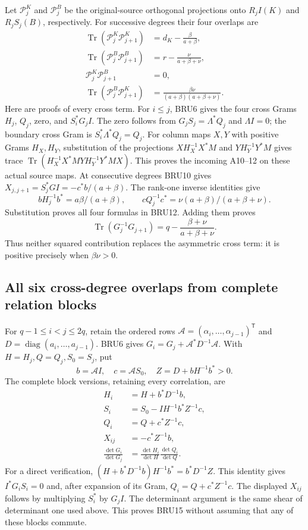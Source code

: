 \documentclass[11pt,a4paper]{article}
\begin{document}
Let $\mathcal P_j^K$ and $\mathcal P_j^B$ be the original-source
orthogonal projections onto $R_jI(K)$ and $R_jS_j(B)$, respectively.
For successive degrees their four overlaps are
\[
 \boxed{\begin{aligned}
 \operatorname{Tr}(\mathcal P_j^K\mathcal P_{j+1}^K)
    &=d_K-\frac{\beta}{a+\beta},\\
 \operatorname{Tr}(\mathcal P_j^B\mathcal P_{j+1}^B)
    &=r-\frac{\nu}{a+\beta+\nu},\\
 \mathcal P_j^K\mathcal P_{j+1}^B&=0,\\
 \operatorname{Tr}(\mathcal P_j^B\mathcal P_{j+1}^K)
    &=\frac{\beta\nu}{(a+\beta)(a+\beta+\nu)}.
 \end{aligned}}\tag{BRU12}
\]
Here are proofs of every cross term. For $i\leq j$, BRU6 gives
the four cross Grams $H_j$, $Q_j$, zero, and $S_i^*G_jI$.
The zero follows from $G_jS_j=\Lambda^*Q_j$ and $\Lambda I=0$;
the boundary cross Gram is $S_i^*\Lambda^*Q_j=Q_j$.
For column maps $X,Y$ with positive Grams $H_X,H_Y$, substitution
of the projections $XH_X^{-1}X^*M$ and $YH_Y^{-1}Y^*M$ gives
trace $\operatorname{Tr}(H_X^{-1}X^*MYH_Y^{-1}Y^*MX)$.
This proves the incoming A10--12 on these actual source maps.
At consecutive degrees BRU10 gives
$X_{j,j+1}=S_j^*GI=-c^*b/(a+\beta)$.
The rank-one inverse identities give
\[
 bH_j^{-1}b^*=a\beta/(a+\beta),\qquad
 cQ_j^{-1}c^*=\nu(a+\beta)/(a+\beta+\nu).
\]
Substitution proves all four formulas in BRU12. Adding them proves
\[
 \operatorname{Tr}(G_j^{-1}G_{j+1})
       =q-\frac{\beta+\nu}{a+\beta+\nu}.
 \tag{BRU13}
\]
Thus neither squared contribution replaces the asymmetric cross
term: it is positive precisely when $\beta\nu>0$.

\subsection{All six cross-degree overlaps from complete relation blocks}

For $q-1\leq i<j\leq2q$, retain the ordered rows
$\mathcal A=(\alpha_i,\ldots,\alpha_{j-1})^{\mathsf T}$ and
$D=\operatorname{diag}(a_i,\ldots,a_{j-1})$. BRU6 gives
$G_i=G_j+\mathcal A^*D^{-1}\mathcal A$.
With $H=H_j,Q=Q_j,S_0=S_j$, put
\[
 b=\mathcal A I,\quad c=\mathcal A S_0,\quad
 Z=D+bH^{-1}b^*>0.
 \tag{BRU14}
\]
The complete block versions, retaining every correlation, are
\[
 \boxed{\begin{aligned}
 H_i&=H+b^*D^{-1}b,\\
 S_i&=S_0-IH^{-1}b^*Z^{-1}c,\\
 Q_i&=Q+c^*Z^{-1}c,\\
 X_{ij}&=-c^*Z^{-1}b,\\
 \frac{\det G_i}{\det G_j}
 &=\frac{\det H_i}{\det H}\frac{\det Q_i}{\det Q}.
 \end{aligned}}\tag{BRU15}
\]
For a direct verification,
$(H+b^*D^{-1}b)H^{-1}b^*=b^*D^{-1}Z$.
This identity gives $I^*G_iS_i=0$ and, after expansion of its
Gram, $Q_i=Q+c^*Z^{-1}c$. The displayed $X_{ij}$ follows by
multiplying $S_i^*$ by $G_jI$. The determinant argument is the
same shear of determinant one used above. This proves BRU15
without assuming that any of these blocks commute.
\end{document}
